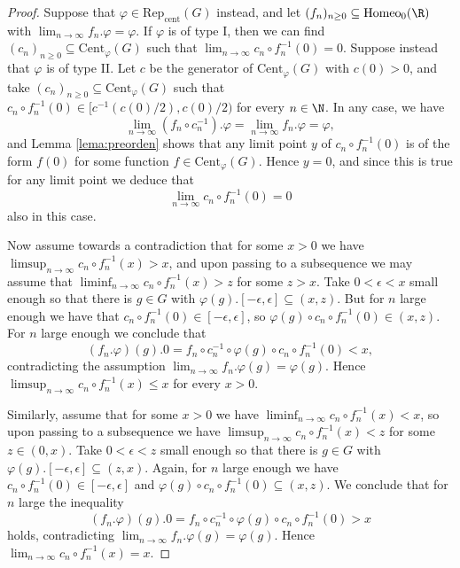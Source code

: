 \documentclass[reqno]{amsart}
\begin{document}
\begin{proof}
Suppose that $\varphi \in \mathrm{Rep}_\mathrm{cent}(G)$ instead, and let $(f_n)_{n \geq 0} \subseteq \mathrm{Homeo}_0(\R)$ with $\lim_{n \to \infty} f_n.\varphi = \varphi$. If $\varphi$ is of type I, then we can find $(c_n)_{n \geq 0} \subseteq \mathrm{Cent}_\varphi(G)$ such that $\lim_{n \to \infty} c_n \circ f_n^{-1}(0) = 0$. Suppose instead that $\varphi$ is of type II. Let $c$ be the generator of $\mathrm{Cent}_\varphi(G)$ with $c(0) > 0$, and take $(c_n)_{n \geq 0} \subseteq \mathrm{Cent}_\varphi(G)$ such that $c_n \circ f_n^{-1}(0) \in [c^{-1}(c(0)/2), c(0)/2)$ for every $n \in \N$. In any case, we have
\[
	\lim_{n \to \infty}(f_n \circ c_n^{-1}).\varphi = \lim_{n \to \infty} f_n.\varphi = \varphi,
\]
and Lemma \ref{lema:preorden} shows that any limit point $y$ of $c_n \circ f_n^{-1}(0)$ is of the form $f(0)$ for some function $f \in \mathrm{Cent}_\varphi(G)$. Hence $y = 0$, and since this is true for any limit point we deduce that
\[
	\lim_{n \to \infty} c_n \circ f_n^{-1}(0) = 0
\]
also in this case.

Now assume towards a contradiction that for some $x > 0$ we have $\limsup_{n \to \infty} c_n \circ f_n^{-1}(x) > x$, and upon passing to a subsequence we may assume that $\liminf_{n \to \infty} c_n \circ f_n^{-1}(x) > z$ for some $z > x$. Take $0 < \epsilon < x$ small enough so that there is $g \in G$ with $\varphi(g).[-\epsilon, \epsilon] \subseteq (x,z)$. But for $n$ large enough we have that $c_n \circ f_n^{-1}(0) \in [-\epsilon, \epsilon]$, so $\varphi(g) \circ c_n \circ f_n^{-1}(0) \in (x,z)$. For $n$ large enough we conclude that
\[
	(f_n.\varphi)(g).0 = f_n \circ c_n^{-1} \circ \varphi(g) \circ c_n \circ f_n^{-1}(0) < x,
\]
contradicting the assumption $\lim_{n \to \infty}f_n.\varphi(g) = \varphi(g)$. Hence $\limsup_{n \to \infty} c_n \circ f_n^{-1}(x) \leq x$ for every $x > 0$. 

Similarly, assume that for some $x > 0$ we have $\liminf_{n \to \infty} c_n \circ f_n^{-1}(x) < x$, so upon passing to a subsequence we have $\limsup_{n \to \infty} c_n \circ f_n^{-1}(x) < z$ for some $z \in (0, x)$. Take $0 < \epsilon < z$ small enough so that there is $g \in G$ with $\varphi(g).[-\epsilon, \epsilon] \subseteq (z,x)$. Again, for $n$ large enough we have $c_n \circ f_n^{-1}(0) \in [-\epsilon, \epsilon]$ and $\varphi(g) \circ c_n \circ f_n^{-1}(0) \subseteq (x,z)$. We conclude that for $n$ large the inequality 
\[
	(f_n.\varphi)(g).0 = f_n \circ c_n^{-1} \circ \varphi(g) \circ c_n \circ f_n^{-1}(0) > x
\]
holds, contradicting $\lim_{n \to \infty}f_n.\varphi(g) = \varphi(g)$. Hence $\lim_{n \to \infty}c_n \circ f_n^{-1}(x) = x$.


\end{proof}
\end{document}
